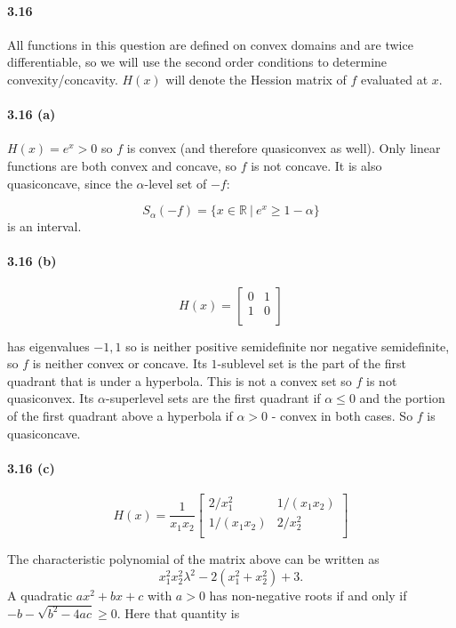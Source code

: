 \documentclass[a4paper,12pt]{article}
\begin{document}
\paragraph*{3.16}
All functions in this question are defined on convex domains and are twice differentiable, so we will use the second order conditions to determine convexity/concavity. $H(x)$ will denote the Hession matrix of $f$ evaluated at $x.$ 

\paragraph*{3.16 (a) }
$H(x) = e^x > 0 $ so $f$ is convex (and therefore quasiconvex as well). Only linear functions are both convex and concave, so $f$ is not concave. It is also quasiconcave, since the $\alpha$-level set of $-f:$ 

$$ S_{\alpha}(-f) = \{ x \in \mathbb{R} \ | \ e^x \geq 1 - \alpha \}$$ 
is an interval. 

\paragraph*{3.16 (b) }

$$
H(x) = 
\begin{bmatrix}
    0       & 1 \\
    1       & 0 \\
\end{bmatrix}
$$

has eigenvalues $-1, 1$ so is neither positive semidefinite nor negative semidefinite, so $f$ is neither convex or concave. Its $1$-sublevel set is the part of the first quadrant that is under a hyperbola. This is not a convex set so $f$ is not quasiconvex. Its $\alpha$-superlevel sets are the first quadrant if $\alpha \leq 0$ and the portion of the first quadrant above a hyperbola if $\alpha >0$ - convex in both cases. So $f$ is quasiconcave. 


\paragraph*{3.16 (c) }
$$
H(x) = \frac{1}{x_1x_2}
\begin{bmatrix}
    2/x_1^2       & 1/(x_1x_2) \\
    1/(x_1x_2)       & 2/x_2^2 \\
\end{bmatrix}
$$

The characteristic polynomial of the matrix above can be written as $$x_1^2 x_2^2 \lambda^2 - 2(x_1^2+x_2^2) + 3.$$
A quadratic $ax^2+bx+c$ with $a>0$ has non-negative roots if and only if $-b - \sqrt{b^2-4ac} \geq 0.$ Here that quantity is 
\end{document}
